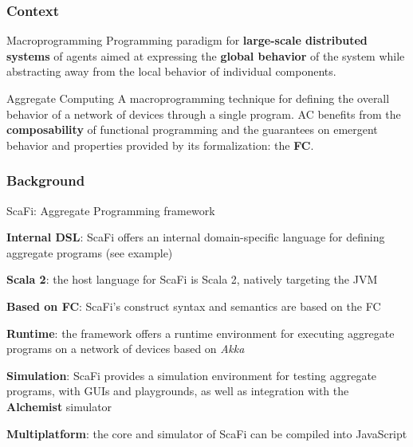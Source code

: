 \begin{frame}
    \titlepage
\end{frame}


\begin{frame}
    \frametitle{Context}
    \begin{block}{Macroprogramming}
        Programming paradigm for \textbf{large-scale distributed systems} of agents aimed at expressing the \textbf{global behavior} of the system while abstracting away from the local behavior of individual components.
    \end{block}
    \begin{block}{Aggregate Computing}
        A macroprogramming technique for defining the overall behavior of a network of devices through a single program.
        \ac{AC} benefits from the \textbf{composability} of functional programming and the guarantees on emergent behavior and properties provided by its formalization: the \textbf{\ac{FC}}.
    \end{block}
\end{frame}

\begin{frame}
    \frametitle{Background}
    \begin{blockitems}{ScaFi: Aggregate Programming framework}
        \item \textbf{Internal \ac{DSL}}: ScaFi offers an internal domain-specific language for defining aggregate programs (see example)
        \item \textbf{Scala 2}: the host language for ScaFi is Scala 2, natively targeting the \ac{JVM}
        \item \textbf{Based on \ac{FC}}: ScaFi's construct syntax and semantics are based on the \ac{FC}
        \item \textbf{Runtime}: the framework offers a runtime environment for executing aggregate programs on a network of devices based on \textit{Akka}
        \item \textbf{Simulation}: ScaFi provides a simulation environment for testing aggregate programs, with \acp{GUI} and playgrounds, as well as integration with the \textbf{Alchemist} simulator
        \item \textbf{Multiplatform}: the core and simulator of ScaFi can be compiled into JavaScript
    \end{blockitems}
\end{frame}


